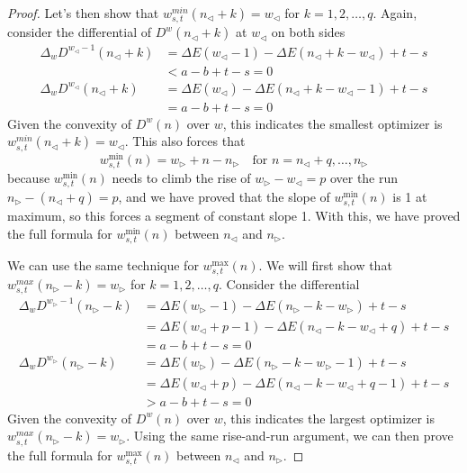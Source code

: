 \documentclass[]{article}
\begin{document}
\begin{proof}
	Let's then show that $w_{s,t}^{min}(n_{\triangleleft} + k) = w_{\triangleleft}$ for $k = 1,2,\dots,q$. Again, consider the differential of $D^w(n_{\triangleleft} + k)$ at $w_{\triangleleft}$ on both sides
	\begin{align*}
		\Delta_w D^{w_{\triangleleft} - 1}(n_{\triangleleft} + k) &= \Delta E(w_{\triangleleft} - 1) - \Delta E(n_{\triangleleft} + k - w_{\triangleleft}) + t - s\\
		&< a-b+t-s = 0\\
		\Delta_w D^{w_{\triangleleft}}(n_{\triangleleft} + k) &= \Delta E(w_{\triangleleft}) - \Delta E(n_{\triangleleft} + k - w_{\triangleleft} - 1) + t - s\\
		&= a -b +t-s = 0
	\end{align*}
	Given the convexity of $D^w(n)$ over $w$, this indicates the smallest optimizer is $w_{s,t}^{min}(n_{\triangleleft} + k) = w_{\triangleleft}$. This also forces that
	\[
	w^{\min}_{s,t}(n) = w_{\triangleright} + n - n_{\triangleright} \quad \text{for } n = n_{\triangleleft} + q,\dots,n_{\triangleright}
	\]
	because $w^{\min}_{s,t}(n)$ needs to climb the rise of $w_{\triangleright} - w_{\triangleleft} = p$ over the run $n_{\triangleright} - (n_{\triangleleft} + q) = p$, and we have proved that the slope of $w^{\min}_{s,t}(n)$ is 1 at maximum, so this forces a segment of constant slope 1. With this, we have proved the full formula for $w^{\min}_{s,t}(n)$ between $n_{\triangleleft}$ and $n_{\triangleright}$.
	
	We can use the same technique for $w^{\max}_{s,t}(n)$. We will first show that  $w_{s,t}^{max}(n_{\triangleright} - k) = w_{\triangleright}$ for $k = 1,2,\dots,q$. Consider the differential
	\begin{align*}
		\Delta_w D^{w_{\triangleright} - 1}(n_{\triangleright} - k) &= \Delta E(w_{\triangleright} - 1) - \Delta E(n_{\triangleright} - k - w_{\triangleright}) + t - s \\
		&=\Delta E(w_{\triangleleft} + p - 1) - \Delta E(n_{\triangleleft} - k - w_{\triangleleft} + q) + t - s\\
		&=a -b+t-s = 0\\
		\Delta_w D^{w_{\triangleright}}(n_{\triangleright} - k) &= \Delta E(w_{\triangleright}) - \Delta E(n_{\triangleright} - k - w_{\triangleright} - 1) + t - s \\
		&=\Delta E(w_{\triangleleft} + p) - \Delta E(n_{\triangleleft} - k - w_{\triangleleft} + q - 1) + t - s\\
		&>a -b +t-s = 0
	\end{align*}
	Given the convexity of $D^w(n)$ over $w$, this indicates the largest optimizer is $w_{s,t}^{max}(n_{\triangleright} - k) = w_{\triangleright}$. Using the same rise-and-run argument, we can then prove the full formula for  $w^{\max}_{s,t}(n)$ between $n_{\triangleleft}$ and $n_{\triangleright}$.
	

\end{proof}
\end{document}
